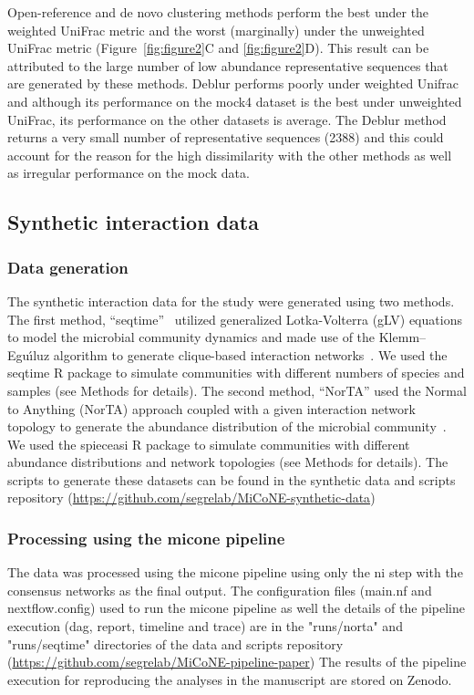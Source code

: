 \documentclass[letterpaper,12pt]{article}
\begin{document}
    Open-reference and de novo clustering methods perform the best under the weighted UniFrac metric and the worst (marginally) under the unweighted UniFrac metric (Figure~\ref{fig:figure2}C and \ref{fig:figure2}D).
    This result can be attributed to the large number of low abundance representative sequences that are generated by these methods.
    Deblur performs poorly under weighted Unifrac and although its performance on the mock4 dataset is the best under unweighted UniFrac, its performance on the other datasets is average.
    The Deblur method returns a very small number of representative sequences (2388) and this could account for the reason for the high dissimilarity with the other methods as well as irregular performance on the mock data.

  \subsection*{Synthetic interaction data}

    \subsubsection*{Data generation}
    The synthetic interaction data for the study were generated using two methods.
    The first method, ``seqtime''~\cite{faustSignaturesEcologicalProcesses2018} utilized generalized Lotka-Volterra (gLV) equations to model the microbial community dynamics and made use of the Klemm–Eguı́luz algorithm to generate clique-based interaction networks~\cite{Rottjers2018}.
    We used the seqtime R package to simulate communities with different numbers of species and samples (see Methods for details).
    The second method, ``NorTA'' used the Normal to Anything (NorTA) approach coupled with a given interaction network topology to generate the abundance distribution of the microbial community~\cite{Kurtz2015}.
    We used the spieceasi R package to simulate communities with different abundance distributions and network topologies (see Methods for details).
    The scripts to generate these datasets can be found in the synthetic data and scripts repository (\href{https://github.com/segrelab/MiCoNE-synthetic-data}{https://github.com/segrelab/MiCoNE-synthetic-data})

    \subsubsection*{Processing using the \ac{micone} pipeline}
    The data was processed using the \ac{micone} pipeline using only the \ac{ni} step with the consensus networks as the final output.
    The configuration files (main.nf and nextflow.config) used to run the \ac{micone} pipeline as well the details of the pipeline execution (dag, report, timeline and trace) are in the "runs/norta" and "runs/seqtime" directories of the data and scripts repository (\href{https://github.com/segrelab/MiCoNE-pipeline-paper}{https://github.com/segrelab/MiCoNE-pipeline-paper})
    The results of the pipeline execution for reproducing the analyses in the manuscript are stored on Zenodo.
\end{document}
